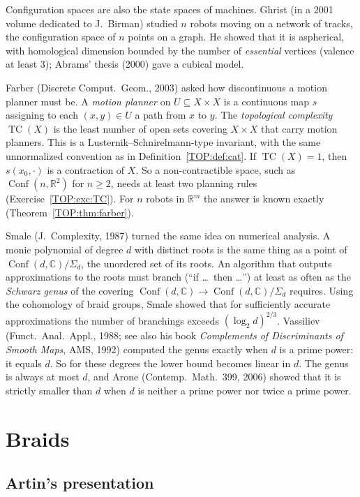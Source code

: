 \documentclass[11pt,openany]{book}
\theoremstyle{plain}
\theoremstyle{definition}
\theoremstyle{remark}
\newcommand{\R}{\mathbb{R}}
\newcommand{\C}{\mathbb{C}}
\newcommand{\Conf}{\operatorname{Conf}}
\begin{document}
Configuration spaces are also the state spaces of machines. Ghrist (in a 2001 volume dedicated to
J.~Birman) studied $n$ robots moving on a network of tracks, the configuration space of $n$ points on a
graph. He showed that it is aspherical, with homological dimension bounded by the number of
\emph{essential} vertices (valence at least $3$); Abrams' thesis (2000) gave a cubical model.

Farber (Discrete Comput.\ Geom., 2003) asked how discontinuous a motion planner must be. A
\emph{motion planner} on $U\subseteq X\times X$ is a continuous map $s$ assigning to each $(x,y)\in U$ a path from $x$
to $y$. The \emph{topological complexity} $\operatorname{TC}(X)$ is the least number of open sets covering
$X\times X$ that carry motion planners. This is a Lusternik--Schnirelmann-type invariant, with the same
unnormalized convention as in Definition~\ref{TOP:def:cat}. If $\operatorname{TC}(X)=1$, then
$s(x_0,\cdot)$ is a contraction of $X$. So a non-contractible space, such as $\Conf(n,\R^2)$ for $n\ge2$,
needs at least two planning rules (Exercise~\ref{TOP:exc:TC}). For $n$ robots
in $\R^m$ the answer is known exactly (Theorem~\ref{TOP:thm:farber}).

Smale (J.\ Complexity, 1987) turned the same idea on numerical analysis. A monic polynomial of degree $d$
with distinct roots is the same thing as a point of $\Conf(d,\C)/\Sigma_d$, the unordered set of its roots.
An algorithm that outputs approximations to the roots must branch (``if \dots\ then \dots'') at least as often as the
\emph{Schwarz genus} of the covering $\Conf(d,\C)\to\Conf(d,\C)/\Sigma_d$ requires. Using the
cohomology of braid groups, Smale showed that for sufficiently accurate approximations the number of
branchings exceeds $(\log_2d)^{2/3}$. Vassiliev
(Funct.\ Anal.\ Appl., 1988; see also his book \emph{Complements of Discriminants of Smooth Maps}, AMS, 1992)
computed the genus exactly when $d$ is a prime power: it equals $d$. So for these degrees the lower bound
becomes linear in $d$. The genus is always at most $d$, and Arone (Contemp.\ Math.\ 399, 2006) showed
that it is strictly smaller than $d$ when $d$ is neither a prime power nor twice a prime power.

\section{Braids}
\label{TOP:sec:braids}

\subsection{Artin's presentation}
\end{document}
